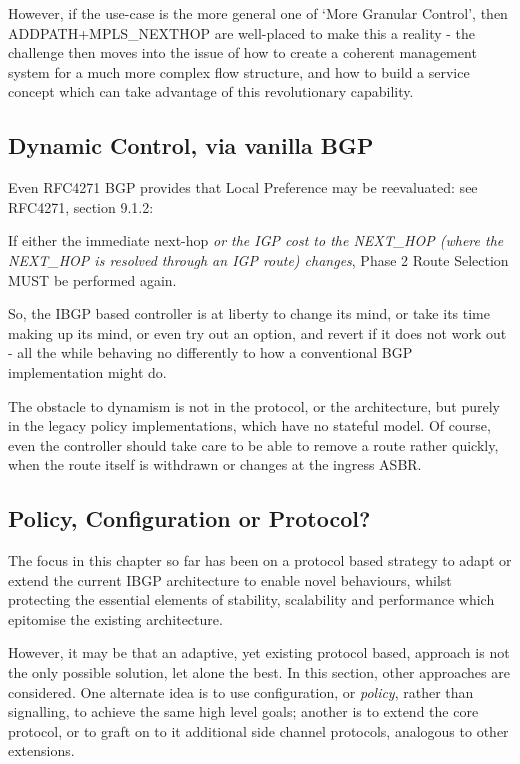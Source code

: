 However, if the use-case is the more general one of `More Granular Control', then ADDPATH+MPLS\_NEXTHOP are well-placed to make this a reality - the challenge then moves into the issue of how to create a coherent management system for a much more complex flow structure, and how to build a service concept which  can take advantage of this revolutionary capability.

\subsection{Dynamic Control, via vanilla BGP}
Even RFC4271 BGP provides that Local Preference may be reevaluated: see RFC4271, section 9.1.2:
\begin{myquote}
	If either the immediate next-hop \emph{or the IGP cost to the NEXT\_HOP (where the NEXT\_HOP is resolved through an IGP route) changes}, Phase 2 Route Selection MUST be performed again.
\end{myquote}

So, the IBGP based controller is at liberty to change its mind, or take its time making up its mind, or even try out an option, and revert if it does not work out - all the while behaving no differently to how a conventional BGP implementation might do.

The obstacle to dynamism is not in the protocol, or the architecture, but purely in the legacy policy implementations, which have no stateful model.  Of course, even the controller should take care to be able to remove a route rather quickly, when the route itself is withdrawn or changes at the ingress ASBR.

\subsection{Policy, Configuration or Protocol?}

The focus in this chapter so far has been on a protocol based strategy to adapt or extend the current IBGP architecture to enable novel behaviours, whilst protecting the essential elements of stability, scalability and performance which epitomise the existing architecture.

However, it may be that an adaptive, yet existing protocol based, approach is not the only possible solution, let alone the best.  In this section, other approaches are considered.  One alternate idea is to use configuration, or \textit{policy}, rather than signalling, to achieve the same high level goals; another is to extend the core protocol, or to graft on to it additional side channel protocols, analogous to other extensions.

